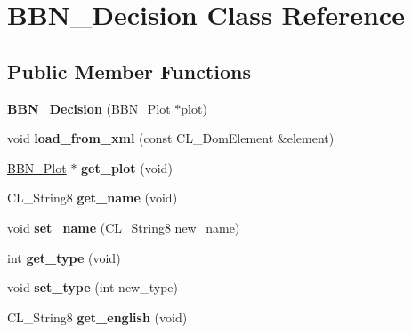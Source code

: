 \hypertarget{classBBN__Decision}{
\section{BBN\_\-Decision Class Reference}
\label{classBBN__Decision}
}
\subsection*{Public Member Functions}
\begin{DoxyCompactItemize}
\item 
\hypertarget{classBBN__Decision_ac249b64693cb21aa5960e822d200b29d}{
{\bfseries BBN\_\-Decision} (\hyperlink{classBBN__Plot}{BBN\_\-Plot} $\ast$plot)}
\label{classBBN__Decision_ac249b64693cb21aa5960e822d200b29d}

\item 
\hypertarget{classBBN__Decision_aa459062927a21ece7c9d63a311500513}{
void {\bfseries load\_\-from\_\-xml} (const CL\_\-DomElement \&element)}
\label{classBBN__Decision_aa459062927a21ece7c9d63a311500513}

\item 
\hypertarget{classBBN__Decision_a18c2870c05eda049b0caf354512cdbbd}{
\hyperlink{classBBN__Plot}{BBN\_\-Plot} $\ast$ {\bfseries get\_\-plot} (void)}
\label{classBBN__Decision_a18c2870c05eda049b0caf354512cdbbd}

\item 
\hypertarget{classBBN__Decision_ae01d2d7c3c244fdcce9c338bbd2697de}{
CL\_\-String8 {\bfseries get\_\-name} (void)}
\label{classBBN__Decision_ae01d2d7c3c244fdcce9c338bbd2697de}

\item 
\hypertarget{classBBN__Decision_ac913d596f7f00fcdcf0704bc26f6c4c0}{
void {\bfseries set\_\-name} (CL\_\-String8 new\_\-name)}
\label{classBBN__Decision_ac913d596f7f00fcdcf0704bc26f6c4c0}

\item 
\hypertarget{classBBN__Decision_a72e419fe1b042ec30bdcec4cb1f64a5a}{
int {\bfseries get\_\-type} (void)}
\label{classBBN__Decision_a72e419fe1b042ec30bdcec4cb1f64a5a}

\item 
\hypertarget{classBBN__Decision_a0fe840d6635329d3200be0d997f83225}{
void {\bfseries set\_\-type} (int new\_\-type)}
\label{classBBN__Decision_a0fe840d6635329d3200be0d997f83225}

\item 
\hypertarget{classBBN__Decision_aa602bd73196367d132331144c9885049}{
CL\_\-String8 {\bfseries get\_\-english} (void)}
\label{classBBN__Decision_aa602bd73196367d132331144c9885049}


\end{DoxyCompactItemize}
